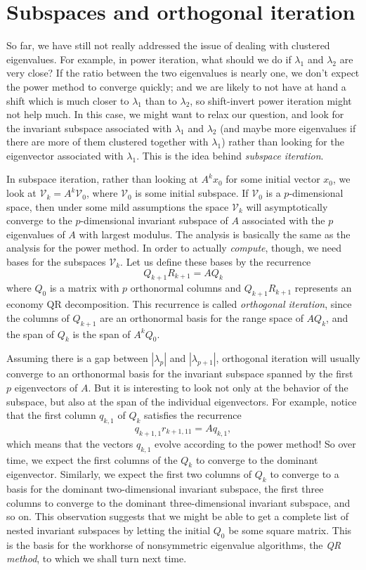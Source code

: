 \section{Subspaces and orthogonal iteration}

So far, we have still not really addressed the issue of dealing with
clustered eigenvalues.  For example, in power iteration, what should
we do if $\lambda_1$ and $\lambda_2$ are very close?  If the ratio
between the two eigenvalues is nearly one, we don't expect the power
method to converge quickly; and we are likely to not have at hand a
shift which is much closer to $\lambda_1$ than to $\lambda_2$, so
shift-invert power iteration might not help much.  In this case, we
might want to relax our question, and look for the invariant subspace
associated with $\lambda_1$ and $\lambda_2$ (and maybe more
eigenvalues if there are more of them clustered together with
$\lambda_1$) rather than looking for the eigenvector associated with
$\lambda_1$.  This is the idea behind {\em subspace iteration}.

In subspace iteration, rather than looking at $A^k x_0$ for some
initial vector $x_0$, we look at $\mathcal{V}_k = A^k \mathcal{V}_0$,
where $\mathcal{V}_0$ is some initial subspace.  If $\mathcal{V}_0$ is
a $p$-dimensional space, then under some mild assumptions the space
$\mathcal{V}_k$ will asymptotically converge to the $p$-dimensional
invariant subspace of $A$ associated with the $p$ eigenvalues of $A$
with largest modulus.  The analysis is basically the same as the
analysis for the power method.  In order to actually {\em compute},
though, we need bases for the subspaces $\mathcal{V}_k$.  Let us define
these bases by the recurrence
\[
  Q_{k+1} R_{k+1} = A Q_k
\]
where $Q_0$ is a matrix with $p$ orthonormal columns and
$Q_{k+1} R_{k+1}$ represents an economy QR decomposition.
This recurrence is called {\em orthogonal iteration}, since
the columns of $Q_{k+1}$ are an orthonormal basis for
the range space of $A Q_k$, and the span of $Q_k$ is the span of $A^k Q_0$.

Assuming there is a gap between $|\lambda_{p}|$ and $|\lambda_{p+1}|$,
orthogonal iteration will usually converge to an orthonormal basis
for the invariant subspace spanned by the first $p$ eigenvectors of $A$.
But it is interesting to look not only at the behavior of the subspace,
but also at the span of the individual eigenvectors.  For example,
notice that the first column $q_{k,1}$ of $Q_k$ satisfies the recurrence
\[
  q_{k+1,1} r_{k+1,11} = A q_{k,1},
\]
which means that the vectors $q_{k,1}$ evolve according to the power method!
So over time, we expect the first columns of the $Q_k$ to converge to the
dominant eigenvector.  Similarly, we expect the first two columns of $Q_k$
to converge to a basis for the dominant two-dimensional invariant subspace,
the first three columns to converge to the dominant three-dimensional
invariant subspace, and so on.  This observation suggests that we might be
able to get a complete list of nested invariant subspaces by letting the
initial $Q_0$ be some square matrix.  This is the basis for the workhorse
of nonsymmetric eigenvalue algorithms, the {\em QR method}, to which we
shall turn next time.
